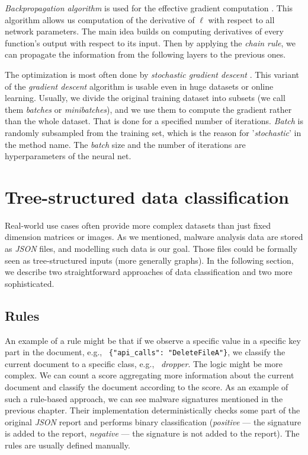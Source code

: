 \emph{Backpropagation algorithm} is used for the effective gradient computation \cite{Rumelhart1988}. This algorithm allows us computation of the derivative of $\ell$ with respect to all network parameters. The main idea builds on computing derivatives of every function's output with respect to its input. Then by applying the \emph{chain rule}, we can propagate the information from the following layers to the previous ones.

The optimization is most often done by \emph{stochastic gradient descent} \cite{Kiefer1952}. This variant of the \emph{gradient descent} algorithm is usable even in huge datasets or online learning. Usually, we divide the original training dataset into subsets (we call them \emph{batches} or \emph{minibatches}), and we use them to compute the gradient rather than the whole dataset. That is done for a specified number of iterations. \emph{Batch} is randomly subsampled from the training set, which is the reason for '\emph{stochastic}' in the method name. The \emph{batch} size and the number of iterations are hyperparameters of the neural net.

\section{Tree-structured data classification}
Real-world use cases often provide more complex datasets than just fixed dimension matrices or images. As we mentioned, malware analysis data are stored as \emph{JSON} files, and modelling such data is our goal. Those files could be formally seen as tree-structured inputs (more generally graphs). In the following section, we describe two straightforward approaches of data classification and two more sophisticated.

\subsection{Rules}
An example of a rule might be that if we observe a specific value in a specific key part in the document, e.g., \ \lstinline|{"api_calls": "DeleteFileA"}|, we classify the current document to a specific class, e.g., \ \emph{dropper}. The logic might be more complex. We can count a score aggregating more information about the current document and classify the document according to the score. As an example of such a rule-based approach, we can see malware signatures mentioned in the previous chapter. Their implementation deterministically checks some part of the original \emph{JSON} report and performs binary classification (\emph{positive} --- the signature is added to the report, \emph{negative} --- the signature is not added to the report). The rules are usually defined manually.

